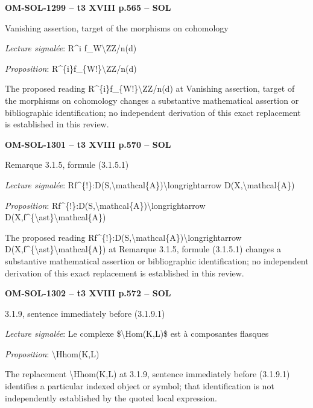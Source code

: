 \par\noindent\textbf{OM-SOL-1299 -- t3 XVIII p.565 -- SOL}\par
Vanishing assertion, target of the morphisms on cohomology\par
\emph{Lecture signalée}: R\textasciicircum{}i f\_W\textbackslash{}ZZ/n(d)\par
\emph{Proposition}: R\textasciicircum{}\{i\}f\_\{W!\}\textbackslash{}ZZ/n(d)\par
The proposed reading R\textasciicircum{}\{i\}f\_\{W!\}\textbackslash{}ZZ/n(d) at Vanishing assertion, target of the morphisms on cohomology changes a substantive mathematical assertion or bibliographic identification; no independent derivation of this exact replacement is established in this review.\par
\par\noindent\textbf{OM-SOL-1301 -- t3 XVIII p.570 -- SOL}\par
Remarque 3.1.5, formule (3.1.5.1)\par
\emph{Lecture signalée}: Rf\textasciicircum{}\{!\}:D(S,\textbackslash{}mathcal\{A\})\textbackslash{}longrightarrow D(X,\textbackslash{}mathcal\{A\})\par
\emph{Proposition}: Rf\textasciicircum{}\{!\}:D(S,\textbackslash{}mathcal\{A\})\textbackslash{}longrightarrow D(X,f\textasciicircum{}\{\textbackslash{}ast\}\textbackslash{}mathcal\{A\})\par
The proposed reading Rf\textasciicircum{}\{!\}:D(S,\textbackslash{}mathcal\{A\})\textbackslash{}longrightarrow D(X,f\textasciicircum{}\{\textbackslash{}ast\}\textbackslash{}mathcal\{A\}) at Remarque 3.1.5, formule (3.1.5.1) changes a substantive mathematical assertion or bibliographic identification; no independent derivation of this exact replacement is established in this review.\par
\par\noindent\textbf{OM-SOL-1302 -- t3 XVIII p.572 -- SOL}\par
3.1.9, sentence immediately before (3.1.9.1)\par
\emph{Lecture signalée}: Le complexe \$\textbackslash{}Hom(K,L)\$ est à composantes flasques\par
\emph{Proposition}: \textbackslash{}Hhom(K,L)\par
The replacement \textbackslash{}Hhom(K,L) at 3.1.9, sentence immediately before (3.1.9.1) identifies a particular indexed object or symbol; that identification is not independently established by the quoted local expression.\par
